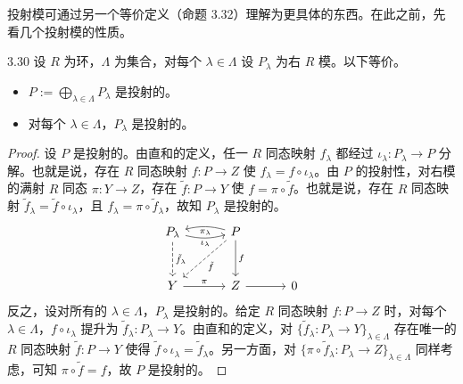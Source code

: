 投射模可通过另一个等价定义（命题 3.32）理解为更具体的东西。在此之前，先看几个投射模的性质。

\begin{lemma}{3.30}
设 $R$ 为环，$\Lambda$ 为集合，对每个 $\lambda\in\Lambda$ 设 $P_\lambda$ 为右 $R$ 模。以下等价。
\begin{itemize}
\item $P:=\bigoplus_{\lambda\in\Lambda}P_\lambda$ 是投射的。
\item 对每个 $\lambda\in\Lambda$，$P_\lambda$ 是投射的。
\end{itemize}
\end{lemma}

\begin{proof}
设 $P$ 是投射的。由直和的定义，任一 $R$ 同态映射 $f_\lambda$ 都经过 $\iota_\lambda\colon P_\lambda\to P$ 分解。也就是说，存在 $R$ 同态映射 $f\colon P\to Z$ 使 $f_\lambda=f\circ\iota_\lambda$。由 $P$ 的投射性，对右模的满射 $R$ 同态 $\pi\colon Y\to Z$，存在 $\tilde f\colon P\to Y$ 使 $f=\pi\circ\tilde f$。也就是说，存在 $R$ 同态映射 $\tilde f_\lambda=\tilde f\circ\iota_\lambda$，且 $f_\lambda=\pi\circ\tilde f_\lambda$，故知 $P_\lambda$ 是投射的。
\[
\begin{tikzcd}[row sep=2.8em, column sep=3.2em]
P_\lambda \arrow[r,bend right=14,"\iota_\lambda"'] \arrow[d,dashed,"\tilde f_\lambda"] & P \arrow[l,bend right=14,"\pi_\lambda"] \arrow[dl,dashed,"\tilde f"] \arrow[d,"f"] \\
Y \arrow[r,"\pi"] & Z \arrow[r] & 0
\end{tikzcd}
\]
反之，设对所有的 $\lambda\in\Lambda$，$P_\lambda$ 是投射的。给定 $R$ 同态映射 $f\colon P\to Z$ 时，对每个 $\lambda\in\Lambda$，$f\circ\iota_\lambda$ 提升为 $\tilde f_\lambda\colon P_\lambda\to Y$。由直和的定义，对 $\{\tilde f_\lambda\colon P_\lambda\to Y\}_{\lambda\in\Lambda}$ 存在唯一的 $R$ 同态映射 $\tilde f\colon P\to Y$ 使得 $\tilde f\circ\iota_\lambda=\tilde f_\lambda$。另一方面，对 $\{\pi\circ\tilde f_\lambda\colon P_\lambda\to Z\}_{\lambda\in\Lambda}$ 同样考虑，可知 $\pi\circ\tilde f=f$，故 $P$ 是投射的。
\end{proof}


